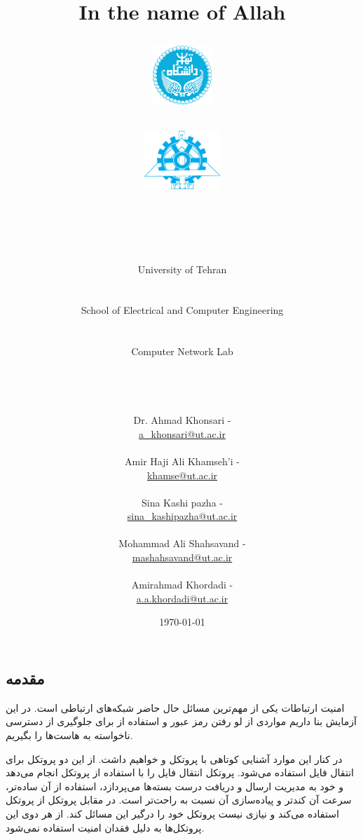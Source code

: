\documentclass[10pt,a4paper]{article}
\title{
\normalsize In the name of Allah\\
\vspace{10pt}
\LARGE\FR{بسم \allah الرحمن الرحیم}
\vspace{10pt}
\begin{center}
    \begin{minipage}{0.48\textwidth}
        \begin{flushleft}
            \includegraphics[height=64pt,width=64pt]{../img/logo.png}
        \end{flushleft}
    \end{minipage}
    \begin{minipage}{0.48\textwidth}
        \begin{flushright}
            \includegraphics[height=64pt]{../img/eng-logo.png}
        \end{flushright}
    \end{minipage}
\end{center}
\vspace*{-64pt}
\huge \titleText\\
\vspace{40pt}
}
\author{
\huge University of Tehran\\
\LARGE \FR{دانشگاه تهران}\\
\\
\LARGE School of Electrical and Computer Engineering\\
\FR{دانشکده مهندسی برق و کامپیوتر}\\
\\
\Large Computer Network Lab\\
\FR{آزمایشگاه شبکه‌های کامپیوتری}\\
\\
\\
\\
\normalfont
Dr. Ahmad Khonsari - \FR{احمد خونساری}\\
\href{mailto:a_khonsari@ut.ac.ir}{a\_khonsari@ut.ac.ir}\\
\\
\normalsize
Amir Haji Ali Khamseh'i - \FR{امیر حاجی علی خمسه‌ء}\\
\href{mailto:khamse@ut.ac.ir}{khamse@ut.ac.ir}\\
\\
\normalsize
Sina Kashi pazha - \FR{سینا کاشی پزها}\\
\href{mailto:sina\_kashipazha@ut.ac.ir}{sina\_kashipazha@ut.ac.ir}\\
\\
\normalsize
Mohammad Ali Shahsavand - \FR{محمد علی شاهسوند}\\
\href{mailto:mashahsavand@ut.ac.ir}{mashahsavand@ut.ac.ir}\\
\\
\normalsize
Amirahmad Khordadi - \FR{امیر احمد خردادی}\\
\href{mailto:a.a.khordadi@ut.ac.ir}{a.a.khordadi@ut.ac.ir}
}
\date{\vspace{30pt}\today\\\vspace{10pt}{\selectlanguage{farsi}\today}}
\numberwithin{equation}{section}
\numberwithin{figure}{section}
\numberwithin{table}{section}
\begin{document}

    \maketitle


    \pagebreak

\begin{otherlanguage}{farsi}
    \section*{مقدمه}
    \par
    امنيت ارتباطات یکی از مهم‌ترین مسائل حال حاضر شبکه‌های ارتباطی است. در این آزمایش بنا داریم مواردی از لو رفتن رمز عبور و استفاده از   برای جلوگيری از دسترسی ناخواسته به هاست‌ها را بگيريم. \par
در کنار این موارد آشنایی کوتاهی با پروتکل  و  خواهيم داشت. از این دو پروتکل برای انتقال فایل استفاده می‌شود. پروتکل  انتقال فایل را با استفاده از پروتکل  انجام می‌دهد و خود به مدیريت ارسال و دریافت درست بسته‌ها می‌پردازد، استفاده از آن ساده‌تر، سرعت آن کند‌تر و پياده‌سازی آن نسبت به  راحت‌تر است. در مقابل پروتکل  از پروتکل  استفاده می‌کند و نيازی نيست پروتکل  خود را درگير این مسائل کند. از هر دوی این پروتکل‌ها به دليل فقدان امنيت استفاده نمی‌شود.

\end{otherlanguage}
\end{document}
